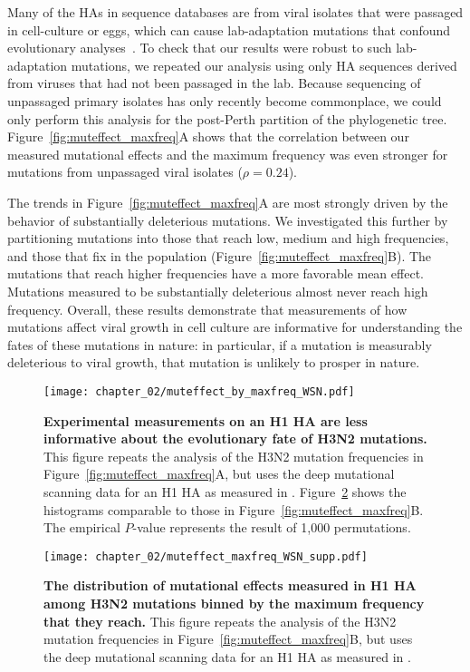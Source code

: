 Many of the HAs in sequence databases are from viral isolates that were passaged in cell-culture or eggs, which can cause lab-adaptation mutations that confound evolutionary analyses~\citep{McWhite:2016fe}.
To check that our results were robust to such lab-adaptation mutations, we repeated our analysis using only HA sequences derived from viruses that had not been passaged in the lab.
Because sequencing of unpassaged primary isolates has only recently become commonplace, we could only perform this analysis for the post-Perth partition of the phylogenetic tree.
Figure~\ref{fig:muteffect_maxfreq}A shows that the correlation between our measured mutational effects and the maximum frequency was even stronger for mutations from unpassaged viral isolates ($\rho = 0.24$).

The trends in Figure~\ref{fig:muteffect_maxfreq}A are most strongly driven by the behavior of substantially deleterious mutations.
We investigated this further by partitioning mutations into those that reach low, medium and high frequencies, and those that fix in the population (Figure~\ref{fig:muteffect_maxfreq}B).
The mutations that reach higher frequencies have a more favorable mean effect.
Mutations measured to be substantially deleterious almost never reach high frequency.
Overall, these results demonstrate that measurements of how mutations affect viral growth in cell culture are informative for understanding the fates of these mutations in nature: in particular, if a mutation is measurably deleterious to viral growth, that mutation is unlikely to prosper in nature.

\begin{figure}
  \centering
  \texttt{[image: chapter\_02/muteffect\_by\_maxfreq\_WSN.pdf]}
  \caption[{Experimental measurements on an H1 HA are less informative about the evolutionary fate of H3N2 mutations.}]{\label{fig:muteffect_maxfreq_WSN}
    {\bf Experimental measurements on an H1 HA are less informative about the evolutionary fate of H3N2 mutations.}
    This figure repeats the analysis of the H3N2 mutation frequencies in Figure~\ref{fig:muteffect_maxfreq}A, but uses the deep mutational scanning data for an H1 HA as measured in \citep{Doud:2016gm}.
    Figure~\ref{suppfig:muteffect_maxfreq_WSN_supp} shows the histograms comparable to those in Figure~\ref{fig:muteffect_maxfreq}B.
    The empirical $P$-value represents the result of 1,000 permutations.
  }
\end{figure}

\begin{figure}
\centerline{\texttt{[image: chapter\_02/muteffect\_maxfreq\_WSN\_supp.pdf]}}
\caption[{The distribution of mutational effects measured in H1 HA among H3N2 mutations binned by the maximum frequency that they reach.}]{\label{suppfig:muteffect_maxfreq_WSN_supp}
{\bf The distribution of mutational effects measured in H1 HA among H3N2 mutations binned by the maximum frequency that they reach.}
This figure repeats the analysis of the H3N2 mutation frequencies in Figure~\ref{fig:muteffect_maxfreq}B, but uses the deep mutational scanning data for an H1 HA as measured in \citet{Doud:2016gm}.
}
\end{figure}

